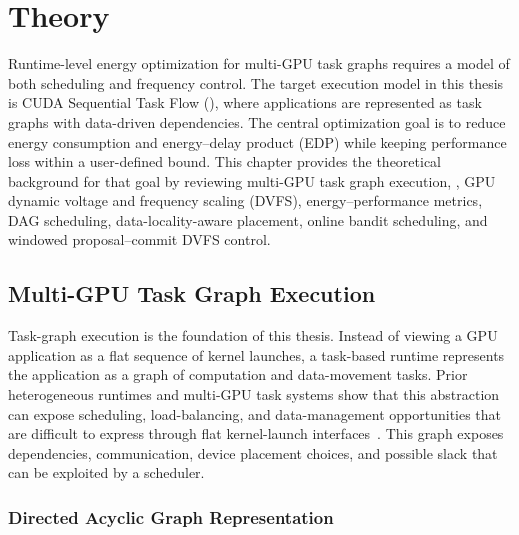 %

\chapter{Theory}
\label{ch:theory}

Runtime-level energy optimization for multi-GPU task graphs requires a model of both scheduling and frequency control. The target execution model in this thesis is CUDA Sequential Task Flow (\CUDASTF{}), where applications are represented as task graphs with data-driven dependencies. The central optimization goal is to reduce energy consumption and energy--delay product (EDP) while keeping performance loss within a user-defined bound. This chapter provides the theoretical background for that goal by reviewing multi-GPU task graph execution, \CUDASTF{}, GPU dynamic voltage and frequency scaling (DVFS), energy--performance metrics, DAG scheduling, data-locality-aware placement, online bandit scheduling, and windowed proposal--commit DVFS control.

\section{Multi-GPU Task Graph Execution}
\label{sec:theory_task_graphs}

Task-graph execution is the foundation of this thesis. Instead of viewing a GPU application as a flat sequence of kernel launches, a task-based runtime represents the application as a graph of computation and data-movement tasks. Prior heterogeneous runtimes and multi-GPU task systems show that this abstraction can expose scheduling, load-balancing, and data-management opportunities that are difficult to express through flat kernel-launch interfaces~\cite{Augonnet2011StarPU,Chen2022CASE,John2024WorkSharing}. This graph exposes dependencies, communication, device placement choices, and possible slack that can be exploited by a scheduler.

\subsection{Directed Acyclic Graph Representation}
\label{subsec:dag_representation}

